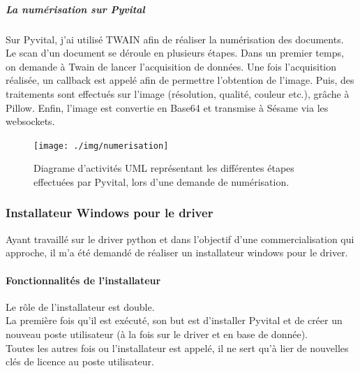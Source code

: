 \subparagraph*{La numérisation sur Pyvital}
Sur Pyvital, j'ai utilisé TWAIN afin de réaliser la numérisation des documents. Le scan d'un document se déroule en plusieurs étapes. Dans un premier temps, on demande à Twain de lancer l'acquisition de données. Une fois l'acquisition réalisée, un callback est appelé afin de permettre l'obtention de l'image. Puis, des traitements sont effectués sur l'image (résolution, qualité, couleur etc.), grâche à Pillow. Enfin, l'image est convertie en Base64 et transmise à Sésame via les websockets.
 
\begin{figure}[H]
  \centering
  \texttt{[image: ./img/numerisation]}
  \caption{\label{fig:diag_seq_sesame} Diagrame d'activités UML représentant les différentes étapes effectuées par Pyvital, lors d'une demande de numérisation.}
\end{figure}


		
\subsubsection{Installateur Windows pour le driver}
Ayant travaillé sur le driver python et dans l'objectif d'une commercialisation qui approche, il m'a été demandé de réaliser un installateur windows pour le driver.

\paragraph*{Fonctionnalités de l'installateur\\}
Le rôle de l'installateur est double.\\ 
La première fois qu'il est exécuté, son but est d'installer Pyvital et de créer un nouveau poste utilisateur (à la fois sur le driver et en base de donnée). \\
Toutes les autres fois ou l'installateur est appelé, il ne sert qu'à lier de nouvelles clés de licence au poste utilisateur.\\

